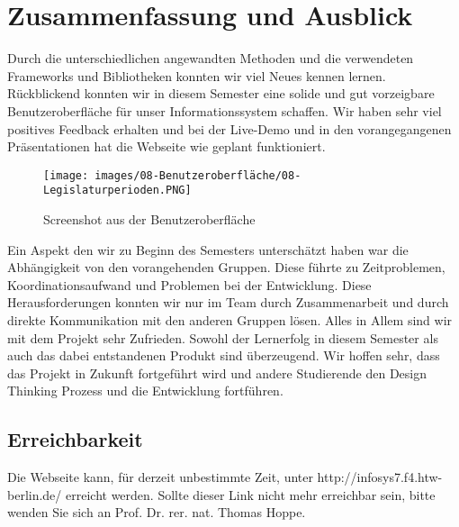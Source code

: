 \section{Zusammenfassung und Ausblick}\label{sec:08_05_zusammenfassung}
Durch die unterschiedlichen angewandten Methoden und die verwendeten Frameworks und Bibliotheken konnten wir viel Neues kennen lernen. Rückblickend konnten wir in diesem Semester eine solide und gut vorzeigbare Benutzeroberfläche für unser Informationssystem schaffen. Wir haben sehr viel positives Feedback erhalten und bei der Live-Demo und in den vorangegangenen Präsentationen hat die Webseite wie geplant funktioniert.

\begin{figure}[hbt!]
    \centering
    \texttt{[image: images/08-Benutzeroberfläche/08-Legislaturperioden.PNG]}
    \caption{Screenshot aus der Benutzeroberfläche}
\end{figure}

Ein Aspekt den wir zu Beginn des Semesters unterschätzt haben war die Abhängigkeit von den vorangehenden Gruppen. Diese führte zu Zeitproblemen, Koordinationsaufwand und Problemen bei der Entwicklung. Diese Herausforderungen konnten wir nur im Team durch Zusammenarbeit und durch direkte Kommunikation mit den anderen Gruppen lösen.
Alles in Allem sind wir mit dem Projekt sehr Zufrieden. Sowohl der Lernerfolg in diesem Semester als auch das dabei entstandenen Produkt sind überzeugend. Wir hoffen sehr, dass das Projekt in Zukunft fortgeführt wird und andere Studierende den Design Thinking Prozess und die Entwicklung fortführen.

\subsection{Erreichbarkeit}
Die Webseite kann, für derzeit unbestimmte Zeit, unter http://infosys7.f4.htw-berlin.de/ erreicht werden. Sollte dieser Link nicht mehr erreichbar sein, bitte wenden Sie sich an Prof. Dr. rer. nat. Thomas Hoppe.



